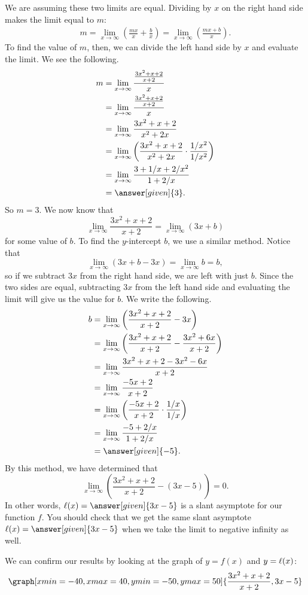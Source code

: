\documentclass{ximera}
\begin{document}
\begin{example}
\begin{explanation}
    We are assuming these two limits are equal.  Dividing by $x$ on the right hand side makes the limit equal to $m$:
    \begin{align*}
    m = \lim_{x \to \infty} \left(\frac{mx}{x} + \frac{b}{x}\right) = \lim_{x \to \infty} \left(\frac{mx+b}{x}\right).
    \end{align*}
    To find the value of $m$, then, we can divide the left hand side by $x$ and evaluate the limit.   We see the following. 
    \begin{align*}
      m &=\lim_{x\to\infty}\frac{\frac{3x^2+x+2}{x+2}}{x}\\
      &= \lim_{x\to\infty}\frac{\frac{3x^2+x+2}{x+2}}{x}\\
      &= \lim_{x\to\infty}\frac{3x^2+x+2}{x^2+2x}\\
      &= \lim_{x\to\infty}\left(\frac{3x^2+x+2}{x^2+2x}\cdot\frac{1/x^2}{1/x^2}\right)\\
      &= \lim_{x\to\infty}\frac{3+1/x+2/x^2}{1+2/x}\\
      &= \answer[given]{3}.
    \end{align*}
    So $m=3$.  We now know that
    \[
    \lim_{x \to \infty}\frac{3x^2 +x+2}{x+2} = \lim_{x \to \infty} (3x + b)
    \]
    for some value of $b$.  To find the $y$-intercept $b$, we use a similar method.  Notice that
    \[
    \lim_{x \to \infty}( 3x + b - 3x )= \lim_{x \to \infty} b = b,
    \]
    so if we subtract $3x$ from the right hand side, we are left with just $b$.  Since the two sides are equal, subtracting $3x$ from the left hand side and evaluating the limit will give us the value for $b$.  We write the following.
    \begin{align*}
      b &=\lim_{x\to\infty} \left(\frac{3x^2+x+2}{x+2} - 3x\right)\\
      &=\lim_{x\to\infty} \left( \frac{3x^2+x+2}{x+2} - \frac{3x^2 + 6x}{x+2}\right) \\
      &=\lim_{x\to\infty} \frac{3x^2+x+2-3x^2-6x}{x+2}\\
      &=\lim_{x\to\infty}  \frac{-5x+2}{x+2}\\
      &=\lim_{x\to\infty} \left(\frac{-5x+2}{x+2}\cdot\frac{1/x}{1/x}\right)\\
      &=\lim_{x\to\infty} \frac{-5+2/x}{1+2/x}\\
      &= \answer[given]{-5}.
    \end{align*}
    By this method, we have determined that 
    \[
    \lim_{x\to\infty}\left(\frac{3x^2+x+2}{x+2} - (3x-5) \right) = 0.
    \]
   In other words, $\l(x) = \answer[given]{3x-5}$ is a slant asymptote
   for our function $f$.  You should check that we get the same slant
   asymptote $\l(x) = \answer[given]{3x-5}$ when we take the limit to
   negative infinity as well.
   \begin{onlineOnly}
     We can confirm our results by looking at the graph of $y=f(x)$
     and $y=\ell(x)$:
     \[
     \graph[xmin=-40,xmax=40,ymin=-50,ymax=50]{\frac{3x^2+x+2}{x+2}, 3x-5}
     \]
   \end{onlineOnly}
  \end{explanation}
\end{example}
\end{document}
